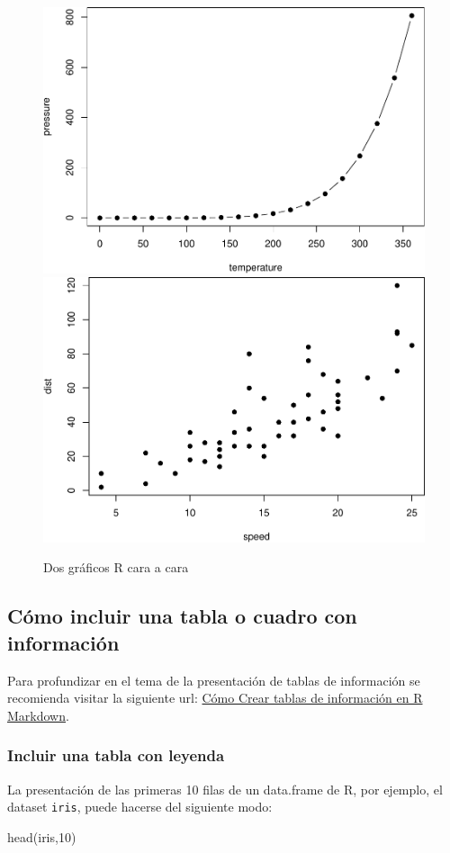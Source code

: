 \documentclass[12pt,a4paper,oneside,]{article}
\newenvironment{Shaded}{\begin{snugshade}}{\end{snugshade}}
\newcommand{\DecValTok}[1]{\textcolor[rgb]{0.00,0.00,0.81}{#1}}
\newcommand{\FunctionTok}[1]{\textcolor[rgb]{0.00,0.00,0.00}{#1}}
\newcommand{\NormalTok}[1]{#1}
\numberwithin{dummy}{section}
\theoremstyle{ocrenumbox}
\theoremstyle{blacknumex}
\theoremstyle{blacknumbox}
\theoremstyle{ocrenum}
\theoremstyle{ocrenum}
\begin{document}
\begin{figure}[htbp]

{\centering \includegraphics[width=0.45\linewidth]{figurasR/fig2-1} \includegraphics[width=0.45\linewidth]{figurasR/fig2-2} 

}

\caption{Dos gr\'aficos R cara a cara}\label{fig:fig2}
\end{figure}

\hypertarget{cuxf3mo-incluir-una-tabla-o-cuadro-con-informaciuxf3n}{%
\subsection{Cómo incluir una tabla o cuadro con
información}\label{cuxf3mo-incluir-una-tabla-o-cuadro-con-informaciuxf3n}}

Para profundizar en el tema de la presentación de tablas de información
se recomienda visitar la siguiente url:
\href{http://destio.us.es/calvo/post/como-crear-tablas-de-informacion-en-r-markdown/}{Cómo
Crear tablas de información en R Markdown}.

\hypertarget{incluir-una-tabla-con-leyenda}{%
\subsubsection{Incluir una tabla con
leyenda}\label{incluir-una-tabla-con-leyenda}}

La presentación de las primeras 10 filas de un data.frame de R, por
ejemplo, el dataset \texttt{iris}, puede hacerse del siguiente modo:

\begin{Shaded}
\begin{Highlighting}[]
\FunctionTok{head}\NormalTok{(iris,}\DecValTok{10}\NormalTok{)}
\end{Highlighting}
\end{Shaded}
\end{document}
